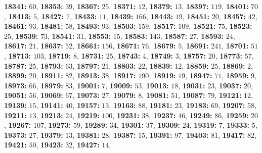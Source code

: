 \textsf{\bfseries 18341:} $60$, \textsf{\bfseries 18353:} $39$, \textsf{\bfseries 18367:} $25$, \textsf{\bfseries 18371:} $12$, \textsf{\bfseries 18379:} $13$, \textsf{\bfseries 18397:} $119$, \textsf{\bfseries 18401:} $70$, \textsf{\bfseries 18413:} $5$, \textsf{\bfseries 18427:} $7$, \textsf{\bfseries 18433:} $11$, \textsf{\bfseries 18439:} $166$, \textsf{\bfseries 18443:} $19$, \textsf{\bfseries 18451:} $20$, \textsf{\bfseries 18457:} $42$, \textsf{\bfseries 18461:} $93$, \textsf{\bfseries 18481:} $58$, \textsf{\bfseries 18493:} $93$, \textsf{\bfseries 18503:} $159$, \textsf{\bfseries 18517:} $109$, \textsf{\bfseries 18521:} $75$, \textsf{\bfseries 18523:} $25$, \textsf{\bfseries 18539:} $73$, \textsf{\bfseries 18541:} $31$, \textsf{\bfseries 18553:} $15$, \textsf{\bfseries 18583:} $143$, \textsf{\bfseries 18587:} $27$, \textsf{\bfseries 18593:} $24$, \textsf{\bfseries 18617:} $21$, \textsf{\bfseries 18637:} $52$, \textsf{\bfseries 18661:} $156$, \textsf{\bfseries 18671:} $76$, \textsf{\bfseries 18679:} $5$, \textsf{\bfseries 18691:} $241$, \textsf{\bfseries 18701:} $51$, \textsf{\bfseries 18713:} $103$, \textsf{\bfseries 18719:} $8$, \textsf{\bfseries 18731:} $25$, \textsf{\bfseries 18743:} $4$, \textsf{\bfseries 18749:} $3$, \textsf{\bfseries 18757:} $20$, \textsf{\bfseries 18773:} $57$, \textsf{\bfseries 18787:} $25$, \textsf{\bfseries 18793:} $63$, \textsf{\bfseries 18797:} $21$, \textsf{\bfseries 18803:} $22$, \textsf{\bfseries 18839:} $12$, \textsf{\bfseries 18859:} $25$, \textsf{\bfseries 18869:} $2$, \textsf{\bfseries 18899:} $20$, \textsf{\bfseries 18911:} $82$, \textsf{\bfseries 18913:} $38$, \textsf{\bfseries 18917:} $190$, \textsf{\bfseries 18919:} $19$, \textsf{\bfseries 18947:} $71$, \textsf{\bfseries 18959:} $9$, \textsf{\bfseries 18973:} $66$, \textsf{\bfseries 18979:} $83$, \textsf{\bfseries 19001:} $7$, \textsf{\bfseries 19009:} $53$, \textsf{\bfseries 19013:} $18$, \textsf{\bfseries 19031:} $23$, \textsf{\bfseries 19037:} $20$, \textsf{\bfseries 19051:} $56$, \textsf{\bfseries 19069:} $67$, \textsf{\bfseries 19073:} $27$, \textsf{\bfseries 19079:} $8$, \textsf{\bfseries 19081:} $51$, \textsf{\bfseries 19087:} $79$, \textsf{\bfseries 19121:} $12$, \textsf{\bfseries 19139:} $15$, \textsf{\bfseries 19141:} $40$, \textsf{\bfseries 19157:} $13$, \textsf{\bfseries 19163:} $88$, \textsf{\bfseries 19181:} $23$, \textsf{\bfseries 19183:} $69$, \textsf{\bfseries 19207:} $58$, \textsf{\bfseries 19211:} $13$, \textsf{\bfseries 19213:} $24$, \textsf{\bfseries 19219:} $100$, \textsf{\bfseries 19231:} $38$, \textsf{\bfseries 19237:} $46$, \textsf{\bfseries 19249:} $86$, \textsf{\bfseries 19259:} $20$, \textsf{\bfseries 19267:} $107$, \textsf{\bfseries 19273:} $59$, \textsf{\bfseries 19289:} $34$, \textsf{\bfseries 19301:} $37$, \textsf{\bfseries 19309:} $24$, \textsf{\bfseries 19319:} $7$, \textsf{\bfseries 19333:} $5$, \textsf{\bfseries 19373:} $27$, \textsf{\bfseries 19379:} $13$, \textsf{\bfseries 19381:} $28$, \textsf{\bfseries 19387:} $15$, \textsf{\bfseries 19391:} $97$, \textsf{\bfseries 19403:} $81$, \textsf{\bfseries 19417:} $82$, \textsf{\bfseries 19421:} $50$, \textsf{\bfseries 19423:} $32$, \textsf{\bfseries 19427:} $14$, 

